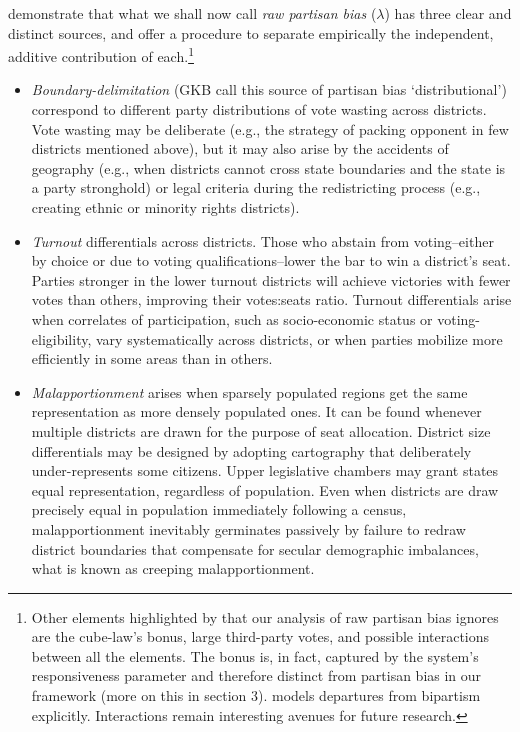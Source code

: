 \documentclass[letter,12pt]{article}
\begin{document}
\citet[][, henceforth GKB]{grofman.etalBiasMalapp.1997} demonstrate that what we shall now call \emph{raw partisan bias} ($\lambda$) has three clear and distinct sources, and offer a procedure to separate empirically the independent, additive contribution of each.\footnote{Other elements highlighted by \citet{gudgin.taylor.1980decomposeBias} that our analysis of raw partisan bias ignores are the cube-law's bonus, large third-party votes, and possible interactions between all the elements. The bonus is, in fact, captured by the system's responsiveness parameter and therefore distinct from partisan bias in our framework (more on this in section 3). \citet{calvo.2009roadToPR} models departures from bipartism explicitly. Interactions remain interesting avenues for future research.} 

\begin{itemize}
\item \emph{Boundary-delimitation} (GKB call this source of partisan bias `distributional') correspond to different party distributions of vote wasting across districts. Vote wasting may be deliberate (e.g., the strategy of packing opponent in few districts mentioned above), but it may also arise by the accidents of geography (e.g., when districts cannot cross state boundaries and the state is a party stronghold) or legal criteria during the redistricting process (e.g., creating ethnic or minority rights districts).
\item \emph{Turnout} differentials across districts. Those who abstain from voting--either by choice or due to voting qualifications--lower the bar to win a district's seat. Parties stronger in the lower turnout districts will achieve victories with fewer votes than others, improving their votes:seats ratio. Turnout differentials arise when correlates of participation, such as socio-economic status or voting-eligibility, vary systematically across districts, or when parties mobilize more efficiently in some areas than in others.
\item \emph{Malapportionment} arises when sparsely populated regions get the same representation as more densely populated ones. It can be found whenever multiple districts are drawn for the purpose of seat allocation. District size differentials may be designed by adopting cartography that deliberately under-represents some citizens. Upper legislative chambers may grant states equal representation, regardless of population. Even when districts are draw precisely equal in population immediately following a census, malapportionment inevitably germinates passively by failure to redraw district boundaries that compensate for secular demographic imbalances, what is known as creeping malapportionment.
\end{itemize} 
\end{document}
